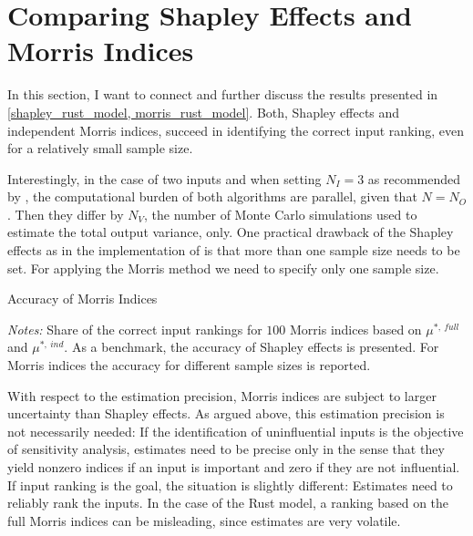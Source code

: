 \section{Comparing Shapley Effects and Morris Indices} \label{comparison}

In this section, I want to connect and further discuss the results presented in \cref{shapley_rust_model, morris_rust_model}. Both, Shapley effects and independent Morris indices, succeed in identifying the correct input ranking, even for a relatively small sample size.

Interestingly, in the case of two inputs and when setting $N_I = 3$ as recommended
by \citet{SNS16}, the computational burden of both algorithms are parallel, given that $N = N_O$. Then they differ by $N_V$, the number of Monte Carlo simulations used to estimate the total output variance, only. One practical drawback
of the Shapley effects as in the implementation of \citet{SNS16} is that more than one sample size needs to be set. For applying the Morris method we need to specify only one sample size.

\begin{table}
	\centering
	\caption{Accuracy of Morris Indices}
	\label{accuracy}
	\begin{threeparttable}
	\centering
	
	\begin{tablenotes}
	\small
	\item \textit{Notes:} Share of the correct input rankings for $100$ Morris indices based on $\mu^{\ast,\ full}$ and $\mu^{\ast,\ ind}$. As a benchmark, the accuracy of Shapley effects is presented. For Morris indices the accuracy for different sample sizes is reported.
	\end{tablenotes}
	\end{threeparttable}
\end{table}

With respect to the estimation precision, Morris indices are subject to larger uncertainty
than Shapley effects. As argued above, this estimation precision is not necessarily needed: If
the identification of uninfluential inputs is the objective of sensitivity analysis, estimates need to be precise
only in the sense that they yield nonzero indices if an input is important and zero if they
are not influential. If input ranking is the goal, the situation is slightly different: Estimates need to reliably rank the inputs.
In the case of the Rust model, a ranking based on the full Morris indices can be misleading, since estimates are very volatile.

